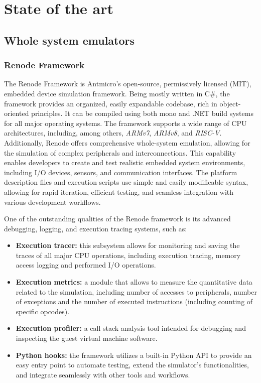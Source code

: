 
\chapter{State of the art} %

\section{Whole system emulators}

\subsection{Renode Framework}

The Renode Framework is Antmicro’s open-source, permissively licensed (MIT), embedded device simulation framework. Being mostly written in C\#, the framework provides an organized,
easily expandable codebase, rich in object-oriented principles. It can be compiled using both mono and .NET build systems for all major operating systems.
The framework supports a wide range of CPU architectures, including, among others, \textit{ARMv7}, \textit{ARMv8}, and \textit{RISC-V}.
Additionally, Renode offers comprehensive whole-system emulation, allowing for the simulation of complex peripherals and interconnections. This capability enables developers to
create and test realistic embedded system environments, including I/O devices, sensors, and communication interfaces. The platform description files and execution scripts
use simple and easily modificable syntax, allowing for rapid iteration, efficient testing, and seamless integration with various development workflows.

One of the outstanding qualities of the Renode framework is its advanced debugging, logging, and execution tracing systems, such as:
\begin{itemize}
	\item \textbf{Execution tracer:} this subsystem allows for monitoring and saving the traces of all major CPU operations, including execution tracing, memory access logging and
		performed I/O operations.
	\item \textbf{Execution metrics:} a module that allows to measure the quantitative data related to the simulation, including number of accesses to peripherals, number of exceptions and
		the number of executed instructions (including counting of specific opcodes).
	\item \textbf{Execution profiler:} a call stack analysis tool intended for debugging and inspecting the guest virtual machine software.
	\item \textbf{Python hooks:} the framework utilizes a built-in Python API to provide an easy entry point to automate testing, extend the simulator's functionalities, and integrate
		seamlessly with other tools and workflows.
\end{itemize}

